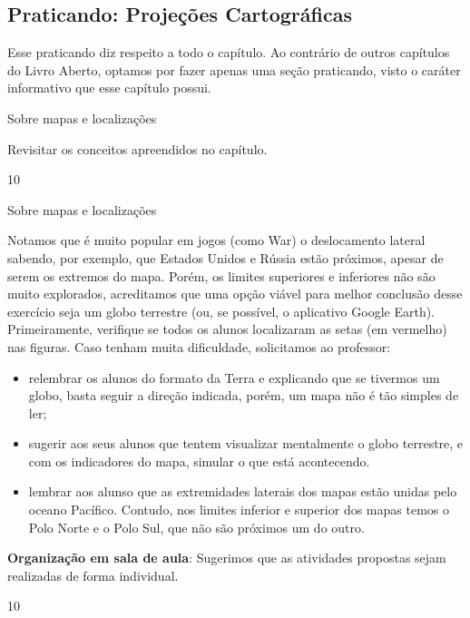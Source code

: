 \begin{texto}
{ 
  \section{Praticando: Projeções Cartográficas}
  Esse praticando diz respeito a todo o capítulo. Ao contrário de outros capítulos do Livro Aberto, optamos por fazer apenas uma seção praticando, visto o caráter  informativo que esse capítulo possui.
}
\end{texto}
\begin{objectives}{Sobre mapas e localizações}
{ Revisitar os conceitos apreendidos no capítulo.
  
}{1}{0}
\end{objectives}
\begin{sugestions}{Sobre mapas e localizações}
{
  Notamos que é muito popular em jogos (como War) o deslocamento lateral sabendo, por exemplo, que Estados Unidos e Rússia estão próximos, apesar de serem os extremos do mapa. Porém, os limites superiores e inferiores não são muito explorados, acreditamos que uma opção viável para melhor conclusão desse exercício seja um globo terrestre (ou, se possível, o aplicativo Google Earth).
  Primeiramente, verifique se todos os alunos localizaram as setas (em vermelho) nas figuras.  Caso tenham muita dificuldade, solicitamos ao professor:
  \begin{itemize}
  \item relembrar os alunos do formato da Terra e explicando que se tivermos um globo, basta seguir a direção indicada, porém, um mapa não é tão simples de ler;
  \item sugerir aos seus alunos que tentem visualizar mentalmente o globo terrestre, e com os indicadores do mapa, simular o que está acontecendo.
  \item lembrar aos alunso que as extremidades laterais dos mapas estão unidas pelo oceano Pacífico. Contudo, nos limites inferior e superior dos mapas temos o Polo Norte e o Polo Sul, que não são próximos um do outro.
  \end{itemize}

  \textbf{Organização em sala de aula}: Sugerimos que as atividades propostas sejam realizadas de forma individual.
}{1}{0}
\end{sugestions}
\clearmargin
